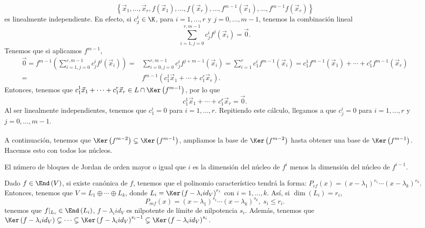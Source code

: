 \[ \left\{ \vec{x}_{1}, \ldots, \vec{x}_{r}, f\left(\vec{x}_{1}\right), \ldots, f\left(\vec{x}_{r}\right), \ldots, f^{m-1}\left(\vec{x}_{1}\right), \ldots, f^{m -1}f\left(\vec{x}_{r}\right)\right\}  \]
es linealmente independiente. En efecto, si $\displaystyle c^{i}_{j} \in \K $, para $\displaystyle i = 1, \ldots, r $ y $\displaystyle j = 0, \ldots, m -1 $, tenemos la combinación lineal
\[\sum^{r, m -1}_{i = 1, j=0}c^{i}_{j}f^{j}\left(\vec{x}_{i}\right) = \vec{0} .\]
Tenemos que si aplicamos $\displaystyle f^{m -1} $,
\[
\begin{split}
	\vec{0} = f^{m -1}\left(\sum^{r, m -1}_{i = 1, j=0}c^{i}_{j}f^{j}\left(\vec{x}_{i}\right)\right) =& \sum^{r, m -1}_{i = 0, j = 0}c^{i}_{j}f^{j+m -1}\left(\vec{x}_{i}\right)=\sum^{r}_{i = 1}c^{i}_{1}f^{m -1}\left(\vec{x}_{i}\right) = c^{1}_{1}f^{m-1}\left(\vec{x}_{1}\right) + \cdots + c^{r}_{1}f^{m -1}\left(\vec{x}_{r}\right) \\
	= & f^{m -1}\left(c^{1}_{1}\vec{x}_{1}+ \cdots + c^{r}_{1}\vec{x}_{r}\right).
\end{split}
\]
Entonces, tenemos que $\displaystyle c^{1}_{1}\vec{x}_{1}+ \cdots + c^{r}_{1}\vec{x}_{r} \in L \cap \Ker\left(f^{m -1}\right) $, por lo que
\[ c^{1}_{1}\vec{x}_{1}+ \cdots + c^{r}_{1}\vec{x}_{r} = \vec{0} .\]
Al ser linealmente independientes, tenemos que $\displaystyle c^{i}_{1} =0 $ para $\displaystyle i = 1, \ldots, r $. Repitiendo este cálculo, llegamos a que $\displaystyle c^{i}_{j} = 0 $ para $\displaystyle i = 1, \ldots, r $ y $\displaystyle j = 0, \ldots, m -1 $. \\ \\
A continuación, tenemos que $\displaystyle \Ker\left(f^{m -2}\right) \subsetneq \Ker\left(f^{m -1}\right) $, ampliamos la base de $\displaystyle \Ker\left(f^{m -2}\right) $ hasta obtener una base de $\displaystyle \Ker\left(f^{m -1}\right) $. Hacemos esto con todos los núcleos. 
\begin{observation}
\normalfont El número de bloques de Jordan de orden mayor o igual que $\displaystyle i $ es la dimensión del núcleo de $\displaystyle f^{i} $ menos la dimensión del núcleo de $\displaystyle f^{i-1} $.
\end{observation}
Dado $\displaystyle f \in \End\left(V\right) $, si existe canónica de $\displaystyle f $, tenemos que el polinomio característico tendrá la forma: $\displaystyle P_{cf}\left(x\right) = \left(x-\lambda_{1}\right)^{r_{1}} \cdots \left(x - \lambda_{k}\right)^{r_{k}} $. Entonces, tenemos que $\displaystyle V = L_{1} \oplus \cdots \oplus L_{k} $, donde $\displaystyle L_{i} = \Ker\left(f-\lambda_{i}id _{V}\right)^{r_{i}} $ con $\displaystyle i =1, \ldots, k $. Así, si $\displaystyle \dim\left(L_{i}\right) = r_{i}$,
\[P_{mf}\left(x\right) = \left(x - \lambda_{1}\right)^{s_{1}} \cdots \left(x - \lambda_{k}\right)^{s_{k}}, \; s_{i} \leq r_{i} .\]
tenemos que $\displaystyle f|_{L_{i}} \in \End\left(L_{i}\right) $, $\displaystyle f -\lambda_{i}id _{V} $ es nilpotente de límite de nilpotencia $\displaystyle s_{i} $. Además, tenemos que $\displaystyle \Ker\left(f - \lambda_{i} id _{V}\right) \subsetneq \cdots \subsetneq \Ker\left(f - \lambda_{i} id _{V}\right)^{s _{i}-1} \subsetneq \Ker\left(f - \lambda_{i}id _{V}\right)^{s_{i}} $.
